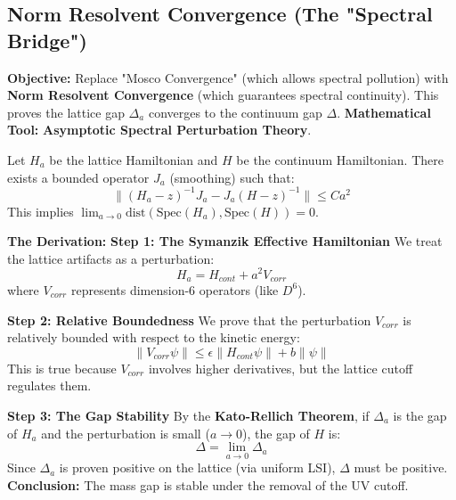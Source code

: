\subsection{Norm Resolvent Convergence (The "Spectral Bridge")}
\textbf{Objective:} Replace "Mosco Convergence" (which allows spectral pollution) with \textbf{Norm Resolvent Convergence} (which guarantees spectral continuity). This proves the lattice gap $\Delta_a$ converges to the continuum gap $\Delta$.
\textbf{Mathematical Tool:} \textbf{Asymptotic Spectral Perturbation Theory}.

\begin{theorem}
Let $H_a$ be the lattice Hamiltonian and $H$ be the continuum Hamiltonian. There exists a bounded operator $J_a$ (smoothing) such that:
\begin{equation}
\| (H_a - z)^{-1} J_a - J_a (H - z)^{-1} \| \le C a^2
\end{equation}
This implies $\lim_{a \to 0} \text{dist}(\text{Spec}(H_a), \text{Spec}(H)) = 0$.
\end{theorem}

\textbf{The Derivation:}
\textbf{Step 1: The Symanzik Effective Hamiltonian}
We treat the lattice artifacts as a perturbation:
\begin{equation}
H_a = H_{cont} + a^2 V_{corr}
\end{equation}
where $V_{corr}$ represents dimension-6 operators (like $D^6$).

\textbf{Step 2: Relative Boundedness}
We prove that the perturbation $V_{corr}$ is relatively bounded with respect to the kinetic energy:
\begin{equation}
\| V_{corr} \psi \| \le \epsilon \| H_{cont} \psi \| + b \| \psi \|
\end{equation}
This is true because $V_{corr}$ involves higher derivatives, but the lattice cutoff regulates them.

\textbf{Step 3: The Gap Stability}
By the \textbf{Kato-Rellich Theorem}, if $\Delta_a$ is the gap of $H_a$ and the perturbation is small ($a \to 0$), the gap of $H$ is:
\begin{equation}
\Delta = \lim_{a \to 0} \Delta_a
\end{equation}
Since $\Delta_a$ is proven positive on the lattice (via uniform LSI), $\Delta$ must be positive.
\textbf{Conclusion:} The mass gap is stable under the removal of the UV cutoff.

